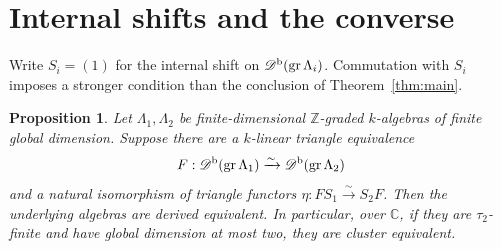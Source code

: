 \documentclass[12pt,a4paper,english,reqno]{amsart}
\theoremstyle{plain}
\newtheorem{prp}[thm]{Proposition}
\theoremstyle{definition}
\numberwithin{equation}{section}
\newcommand{\thmref}[1]{Theorem~\ref{#1}}
\def\et{\eta}
\def\ta{\tau}
\def\La{\Lambda}
\def\Db{{\mathcal D}^{\text{\rm b}}}
\def\bbZ{{\mathbb Z}}
\def\bbC{{\mathbb C}}
\def\ya#1{\xrightarrow{#1}}
\def\gr{\operatorname{gr}}
\begin{document}
\section{Internal shifts and the converse}\label{sec:scope}
Write $S_i=(1)$ for the internal shift on $\Db(\gr\La_i)$. Commutation with $S_i$ imposes a stronger condition than the conclusion of \thmref{thm:main}.

\begin{prp}\label{prop:shift-descent}
Let $\La_1,\La_2$ be finite-dimensional $\bbZ$-graded $k$-algebras of finite global dimension. Suppose there are a $k$-linear triangle equivalence
\[
 F:\Db(\gr\La_1)\ya{\sim}\Db(\gr\La_2)
\]
and a natural isomorphism of triangle functors $\et:FS_1\ya{\sim}S_2F$. Then the underlying algebras are derived equivalent. In particular, over $\bbC$, if they are $\ta_2$-finite and have global dimension at most two, they are cluster equivalent.
\end{prp}
\end{document}
